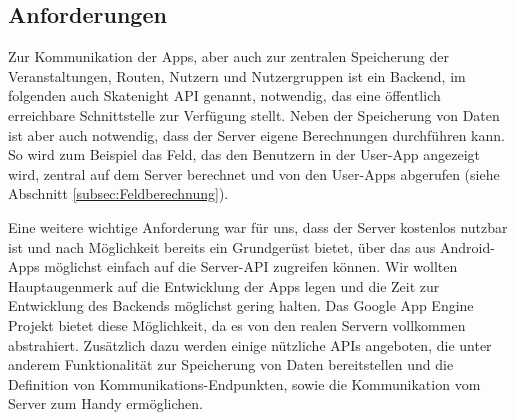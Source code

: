 \subsection{Anforderungen}
Zur Kommunikation der Apps, aber auch zur zentralen Speicherung der Veranstaltungen, Routen, Nutzern und Nutzergruppen ist ein Backend, im folgenden auch Skatenight API genannt, notwendig, das eine öffentlich erreichbare Schnittstelle zur Verfügung stellt. Neben der Speicherung von Daten ist aber auch notwendig, dass der Server eigene Berechnungen durchführen kann. So wird zum Beispiel das Feld, das den Benutzern in der User-App angezeigt wird, zentral auf dem Server berechnet und von den User-Apps abgerufen (siehe Abschnitt \ref{subsec:Feldberechnung}).

Eine weitere wichtige Anforderung war für uns, dass der Server kostenlos nutzbar ist und nach Möglichkeit bereits ein Grundgerüst bietet, über das aus Android-Apps möglichst einfach auf die Server-API zugreifen können. Wir wollten Hauptaugenmerk auf die Entwicklung der Apps legen und die Zeit zur Entwicklung des Backends möglichst gering halten. Das Google App Engine Projekt bietet diese Möglichkeit, da es von den realen Servern vollkommen abstrahiert. Zusätzlich dazu werden einige nützliche APIs angeboten, die unter anderem Funktionalität zur Speicherung von Daten bereitstellen und die Definition von Kommunikations-Endpunkten, sowie die Kommunikation vom Server zum Handy ermöglichen.

